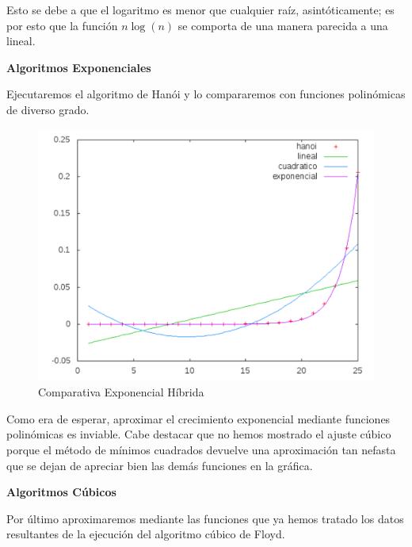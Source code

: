 \documentclass[a4paper, 11pt]{article}
\begin{document}
Esto se debe a que el logaritmo es menor que cualquier raíz, asintóticamente; es por esto que la función $n \log(n)$ se comporta de una manera parecida a una lineal.


\vspace{1cm}

\textbf{Algoritmos Exponenciales}

Ejecutaremos el algoritmo de Hanói y lo compararemos con funciones polinómicas de diverso grado.

\begin{figure}[H]\includegraphics[width=13cm]{img/expo_hibrida2.pdf} \centering
	\caption{Comparativa Exponencial Híbrida}\end{figure}

Como era de esperar, aproximar el crecimiento exponencial mediante funciones polinómicas es inviable. Cabe destacar que no hemos mostrado el ajuste cúbico porque el método de mínimos cuadrados devuelve una aproximación tan nefasta que se dejan de apreciar bien las demás funciones en la gráfica.

\vspace{1cm}

\textbf{Algoritmos Cúbicos}

Por último aproximaremos mediante las funciones que ya hemos tratado los datos resultantes de la ejecución del algoritmo cúbico de Floyd.
\end{document}
